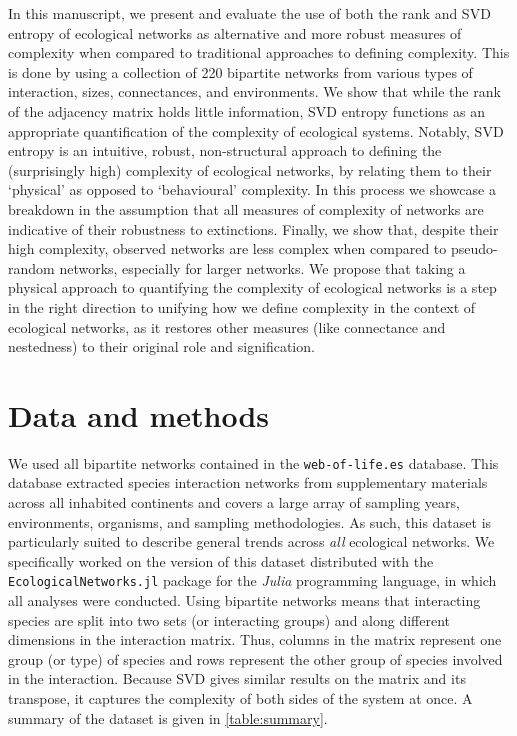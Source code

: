 In this manuscript, we present and evaluate the use of both the rank and SVD
entropy of ecological networks as alternative and more robust measures of
complexity when compared to traditional approaches to defining complexity. This
is done by using a collection of 220 bipartite networks from various types of
interaction, sizes, connectances, and environments. We show that while the rank
of the adjacency matrix holds little information, SVD entropy functions as an
appropriate quantification of the complexity of ecological systems. Notably, SVD
entropy is an intuitive, robust, non-structural approach to defining the
(surprisingly high) complexity of ecological networks, by relating them to their
`physical' as opposed to `behavioural' complexity. In this process we showcase a
breakdown in the assumption that all measures of complexity of networks are
indicative of their robustness to extinctions. Finally, we show that, despite
their high complexity, observed networks are less complex when compared to
pseudo-random networks, especially for larger networks. We propose that taking a
physical approach to quantifying the complexity of ecological networks is a step
in the right direction to unifying how we define complexity in the context of
ecological networks, as it restores other measures (like connectance and
nestedness) to their original role and signification.

\section{Data and methods}\label{data-and-methods}

We used all bipartite networks contained in the \texttt{web-of-life.es}
database. This database extracted species interaction networks from
supplementary materials across all inhabited continents and covers a large array
of sampling years, environments, organisms, and sampling methodologies. As such,
this dataset is particularly suited to describe general trends across \emph{all}
ecological networks. We specifically worked on the version of this dataset
distributed with the \texttt{EcologicalNetworks.jl} package
\cite{Poisot2019EcoJl} for the \emph{Julia} \cite{Bezanson2017JulFre}
programming language, in which all analyses were conducted. Using bipartite
networks means that interacting species are split into two sets (or interacting
groups) and along different dimensions in the interaction matrix. Thus, columns
in the matrix represent one group (or type) of species and rows represent the
other group of species involved in the interaction. Because SVD gives similar
results on the matrix and its transpose, it captures the complexity of both
sides of the system at once. A summary of the dataset is given in
\ref{table:summary}.

